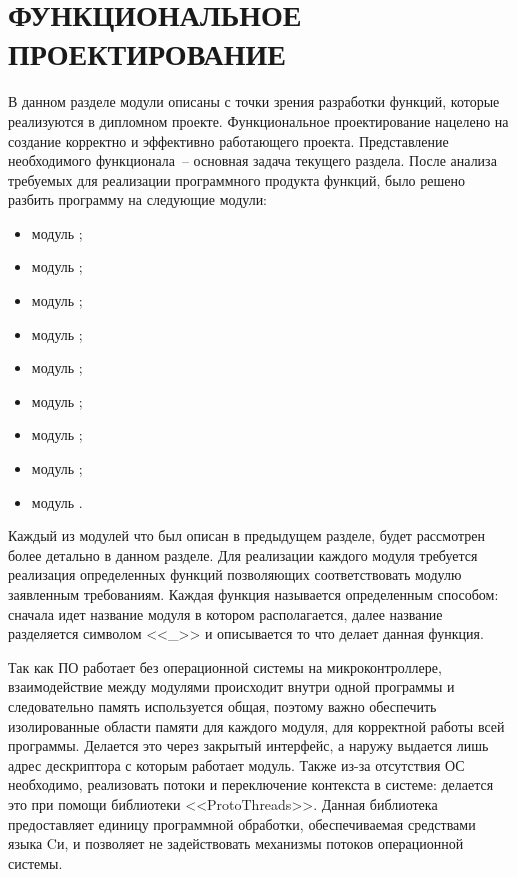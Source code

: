 \section{ФУНКЦИОНАЛЬНОЕ ПРОЕКТИРОВАНИЕ}
\label{sec:func}

В данном разделе модули описаны с точки зрения разработки функций, которые реализуются в
дипломном проекте. Функциональное проектирование нацелено на создание корректно и
эффективно работающего проекта. Представление необходимого функционала~-- основная задача
текущего раздела. После анализа требуемых для реализации программного продукта
функций, было решено разбить программу на следующие модули:

\begin{itemize}
    \item модуль \modulePerifery;
    \item модуль \moduleCalib;
    \item модуль \moduleCalibControl;
    \item модуль \moduleUart;
    \item модуль \moduleMoveDetect;
    \item модуль \moduleOrientationAzimuth;
    \item модуль \moduleFindTarget;
    \item модуль \moduleFlashMemory;
    \item модуль \moduleGraphics.
\end{itemize}

Каждый из модулей что был описан в предыдущем разделе, будет рассмотрен более детально
в данном разделе. Для реализации каждого модуля требуется реализация определенных функций
позволяющих соответствовать модулю заявленным требованиям.
Каждая функция называется определенным способом: сначала идет название модуля в котором располагается,
далее название разделяется символом <<\_>> и описывается то что делает данная функция.

Так как ПО работает без операционной системы на микроконтроллере, взаимодействие между модулями происходит
внутри одной программы и следовательно память используется общая, поэтому важно обеспечить изолированные
области памяти для каждого модуля, для корректной работы всей программы. Делается это через закрытый интерфейс,
а наружу выдается лишь адрес дескриптора с которым работает модуль. Также из-за отсутствия ОС необходимо,
реализовать потоки и переключение контекста в системе: делается это при помощи библиотеки <<ProtoThreads>>.
Данная библиотека предоставляет единицу программной обработки, обеспечиваемая средствами языка Cи, и позволяет
не задействовать механизмы потоков операционной системы.

